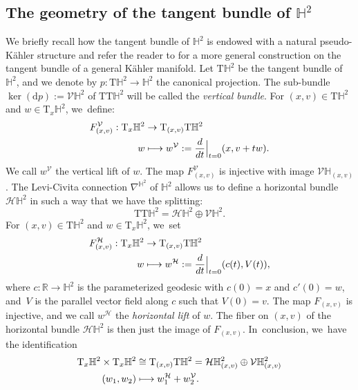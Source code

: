 \documentclass[JEP,XML,SOM,Unicode,NoEqCountersInSection, NoFloatCountersInSection,published]{cedram}
\newcommand\mto{\mathchoice{\longmapsto}{\mapsto}{\mapsto}{\mapsto}}
\theoremstyle{plain}
\theoremstyle{definition}
\begin{document}
\subsection{The geometry of the tangent bundle of \texorpdfstring{$\mathbb{H}^2$}{H2}}
\label{The_geometry_of_the_tangent bundle}
We briefly recall how the tangent bundle of $\mathbb{H}^2$ is endowed with a natural pseudo-Kähler structure and refer the reader to \cite{canonical_pseudo} for a more general construction on the tangent bundle of a general Kähler manifold. Let $\mathrm{T}\mathbb{H}^2$ be the tangent bundle of $\mathbb{H}^2$, and we denote by $p:\mathrm{T}\mathbb{H}^2\to\mathbb{H}^2$ the canonical projection. The sub-bundle $\ker(\mathrm{d}p) := \mathcal{V}\mathbb{H}^2$ of $\mathrm{T}\mathrm{T}\mathbb{H}^2$ will be called the \emph{vertical bundle}. For $(x,v)\in \mathrm{T}\mathbb{H}^2$ and $w\in\mathrm{T}_x\mathbb{H}^2$, we~define:
\[
\begin{aligned}
F^{\mathcal{V}}_{(x,v)}: \mathrm{T}_x\mathbb{H}^2 & \to \mathrm{T}_{(x,v)}\mathrm{T}\mathbb{H}^2 \\
w &\mto w^{\mathcal{V}}:=\frac{d}{dt}\Big\lvert_{t=0} (x,v+tw).
\end{aligned}
\]
We call $w^{\mathcal{V}}$ the vertical lift of $w$. The map $F^{\mathcal{V}}_{(x,v)}$ is injective with image $\mathcal{V}\mathbb{H}_{(x,v)}$.
The Levi-Civita connection $\nabla^{\mathbb{H}^2}$ of $\mathbb{H}^2$ allows us to define a horizontal bundle $\mathcal{H}\mathbb{H}^2$ in such a way that we have the splitting:
\[
\mathrm{T}\mathrm{T}\mathbb{H}^2=\mathcal{H}\mathbb{H}^2\oplus \mathcal{V}\mathbb{H}^2.
\]
For $(x,v)\in \mathrm{T}\mathbb{H}^2$ and $w\in\mathrm{T}_x\mathbb{H}^2$, we~set
\[
\begin{aligned}
F_{(x,v)}^{\mathcal{H}}:\mathrm{T}_x\mathbb{H}^2 & \to \mathrm{T}_{(x,v)}\mathrm{T}\mathbb{H}^2 \\
w &\mto w^{\mathcal{H}}:=\frac{d}{dt}\Big\lvert_{t=0} (c(t),V(t)),
\end{aligned}
\]
where $c:\mathbb{R}\to\mathbb{H}^2$ is the parameterized geodesic with $c(0)=x$ and $c'(0)=w$, and~$V$ is the parallel vector field along $c$ such that $V(0)=v$. The map $F_{(x,v)}$ is injective, and we call $w^{\mathcal{H}}$ the \emph{horizontal lift} of $w$. The fiber on $(x,v)$ of the horizontal bundle $\mathcal{H}\mathbb{H}^2$ is then just the image of $F_{(x,v)}$. In~conclusion, we~have the identification
\begin{equation}\label{splittangent}
\begin{aligned}
\mathrm{T}_x\mathbb{H}^2\times \mathrm{T}_x\mathbb{H}^2 & \cong \mathrm{T}_{(x,v)}\mathrm{T}\mathbb{H}^2=\mathcal{H}\mathbb{H}^2_{(x,v)}\oplus \mathcal{V}\mathbb{H}^2_{(x,v)} \\
(w_1,w_2) & \mto w_1^{\mathcal{H}}+w_2^{\mathcal{V}}.
\end{aligned}
\end{equation}
\end{document}
